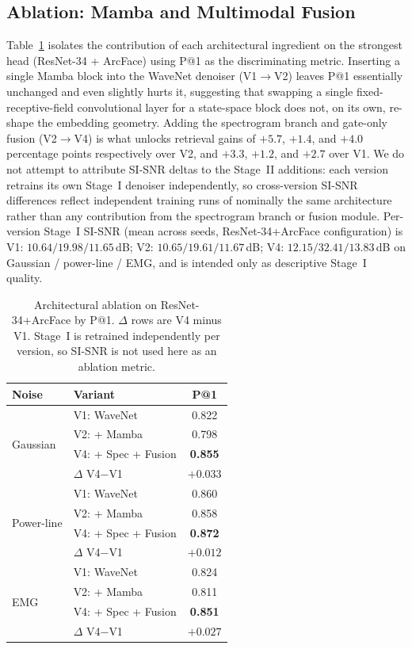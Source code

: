 \documentclass[conference,a4paper]{APSIPA2026}
\begin{document}
\subsection{Ablation: Mamba and Multimodal Fusion}
Table~\ref{tab:ablation} isolates the contribution of each architectural
ingredient on the strongest head (ResNet-34 + ArcFace) using P@1 as the
discriminating metric. Inserting a single Mamba block into the WaveNet
denoiser (V1$\to$V2) leaves P@1 essentially unchanged and even slightly
hurts it, suggesting that swapping a single fixed-receptive-field
convolutional layer for a state-space block does not, on its own,
re-shape the embedding geometry. Adding the spectrogram branch and
gate-only fusion (V2$\to$V4) is what unlocks retrieval gains of
$+5.7$, $+1.4$, and $+4.0$ percentage points respectively over V2, and
$+3.3$, $+1.2$, and $+2.7$ over V1. We do not attempt to attribute
SI-SNR deltas to the Stage~II additions: each version retrains its own
Stage~I denoiser independently, so cross-version SI-SNR differences
reflect independent training runs of nominally the same architecture
rather than any contribution from the spectrogram branch or fusion
module. Per-version Stage~I SI-SNR (mean across seeds, ResNet-34+ArcFace
configuration) is V1: $10.64/19.98/11.65$\,dB; V2:
$10.65/19.61/11.67$\,dB; V4: $12.15/32.41/13.83$\,dB on Gaussian /
power-line / EMG, and is intended only as descriptive Stage~I quality.

\begin{table}[t]
\centering
\caption{Architectural ablation on ResNet-34+ArcFace by P@1.
$\Delta$ rows are V4 minus V1. Stage~I is retrained independently per
version, so SI-SNR is not used here as an ablation metric.}
\label{tab:ablation}
\begin{tabular}{l l c}
\toprule
\textbf{Noise} & \textbf{Variant} & \textbf{P@1} \\
\midrule
\multirow{4}{*}{Gaussian}
 & V1: WaveNet  & 0.822 \\
 & V2: + Mamba  & 0.798 \\
 & V4: + Spec + Fusion & \textbf{0.855} \\
 & $\Delta$ V4$-$V1 & $+0.033$ \\
\midrule
\multirow{4}{*}{Power-line}
 & V1: WaveNet  & 0.860 \\
 & V2: + Mamba  & 0.858 \\
 & V4: + Spec + Fusion & \textbf{0.872} \\
 & $\Delta$ V4$-$V1 & $+0.012$ \\
\midrule
\multirow{4}{*}{EMG}
 & V1: WaveNet  & 0.824 \\
 & V2: + Mamba  & 0.811 \\
 & V4: + Spec + Fusion & \textbf{0.851} \\
 & $\Delta$ V4$-$V1 & $+0.027$ \\
\bottomrule
\end{tabular}
\end{table}
\end{document}
